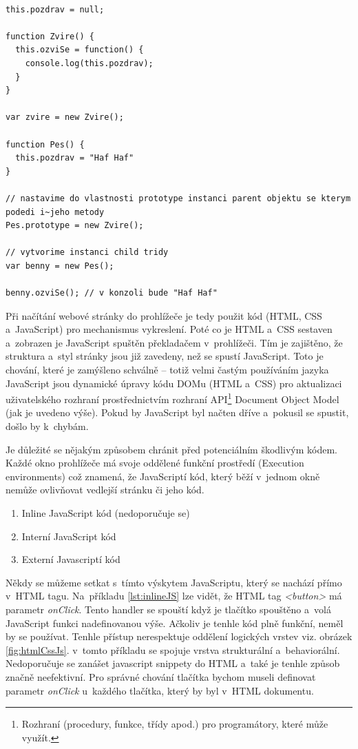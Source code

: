 \begin{lstlisting}[numbers=none, caption=Ukázka OOP v~JavaScriptu, label=lst:OOP]

this.pozdrav = null;

function Zvire() {
  this.ozviSe = function() {
    console.log(this.pozdrav);
  }
}

var zvire = new Zvire();

function Pes() {
  this.pozdrav = "Haf Haf"
}

// nastavime do vlastnosti prototype instanci parent objektu se kterym podedi i~jeho metody
Pes.prototype = new Zvire();

// vytvorime instanci child tridy
var benny = new Pes();

benny.ozviSe(); // v konzoli bude "Haf Haf"
\end{lstlisting}

Při načítání webové stránky do prohlížeče je tedy použit kód (HTML, CSS a~JavaScript) pro mechanismus vykreslení. Poté co je HTML a~CSS sestaven a~zobrazen je JavaScript spuštěn překladačem v~prohlížeči. Tím je zajištěno, že struktura a~styl stránky jsou již zavedeny, než se spustí JavaScript. Toto je chování, které je zamýšleno schválně -- totiž velmi častým používáním jazyka JavaScript jsou dynamické úpravy kódu DOMu (HTML a~CSS) pro aktualizaci uživatelského rozhraní prostřednictvím rozhraní API\footnote{Rozhraní (procedury, funkce, třídy apod.) pro programátory, které může využít.} Document Object Model (jak je uvedeno výše). Pokud by JavaScript byl načten dříve a~pokusil se spustit, došlo by k~chybám.

Je důležité se nějakým způsobem chránit před potenciálním škodlivým kódem. Každé okno prohlížeče má svoje oddělené funkční prostředí (Execution environments) což znamená, že JavaScriptí kód, který běží v~jednom okně nemůže ovlivňovat vedlejší stránku či jeho kód. \\


\begin{enumerate}
	\item Inline JavaScript kód (nedoporučuje se)
	\item Interní JavaScript kód
	\item Externí Javascriptí kód
\end{enumerate}


Někdy se můžeme setkat s~tímto výskytem JavaScriptu, který se nachází přímo v~HTML tagu. Na~příkladu \ref{lst:inlineJS} lze vidět, že HTML tag \textit{<button>} má parametr \textit{onClick}. Tento handler se spouští když je tlačítko spouštěno a~volá JavaScript funkci nadefinovanou výše. Ačkoliv je tenhle kód plně funkční, neměl by se používat. Tenhle přístup nerespektuje oddělení logických vrstev viz. obrázek \ref{fig:htmlCssJs}. v~tomto příkladu se spojuje vrstva strukturální a~behaviorální. Nedoporučuje se zanášet javascript snippety do HTML a~také je tenhle způsob značně neefektivní. Pro správné chování tlačítka bychom museli definovat parametr \textit{onClick} u~každého tlačítka, který by byl v~HTML dokumentu. \\

